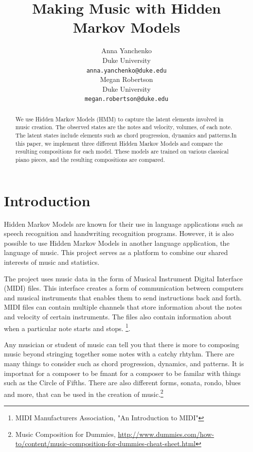 \documentclass{article} %
\title{Making Music with Hidden Markov Models}
\author{
Anna Yanchenko \\
Duke University\\
\texttt{anna.yanchenko@duke.edu} \\
\And
Megan Robertson \\
Duke University \\
\texttt{megan.robertson@duke.edu} \\
}
\begin{document}
\maketitle

\begin{abstract}
We use Hidden Markov Models (HMM) to capture the latent elements involved in music creation. The observed states are the notes and velocity, volumes, of each note. The latent states include elements such as chord progression, dynamics and patterns.In this paper, we implement three different Hidden Markov Models and compare the resulting compositions for each model. These models are trained on various classical piano pieces, and the resulting compositions are compared.
\end{abstract}
 
\section{Introduction}

Hidden Markov Models are known for their use in language applications such as speech recognition and handwriting recognition programs. However, it is also possible to use Hidden Markov Models in another language application, the language of music. This project serves as a platform to combine our shared interests of music and statistics. 

The project uses music data in the form of  Musical Instrument Digital Interface (MIDI) files. This interface creates a form of communication between computers and musical instruments that enables them to send instructions back and forth. MIDI files can contain multiple channels that store information about the notes and velocity of certain instruments. The files also contain information about when a particular note starts and stops. \footnote{MIDI Manufacturers Association, "An Introduction to MIDI"}. 

Any musician or student of music can tell you that there is more to composing music beyond stringing together some notes with a catchy rhtyhm. There are many things to consider such as chord progression, dynamics, and patterns. It is importnat for a composer to be fmant for a composer to be familar with things such as the Circle of Fifths. There are also different forms, sonata, rondo, blues and more, that can be used in the creation of music.\footnote{Music Composition for Dummies, \url{http://www.dummies.com/how-to/content/music-composition-for-dummies-cheat-sheet.html}}
\end{document}
